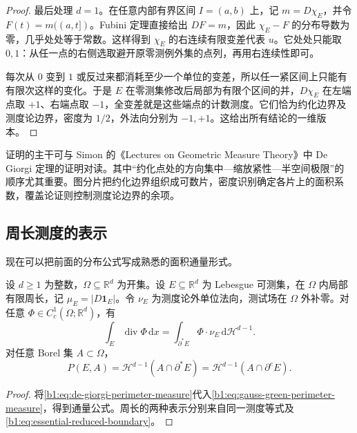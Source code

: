 \begin{proof}
最后处理 \(d=1\)。在任意内部有界区间 \(I=(a,b)\) 上，记 \(m=D\chi_E\)，并令 \(F(t)=m((a,t])\)。Fubini 定理直接给出 \(DF=m\)，因此 \(\chi_E-F\) 的分布导数为零，几乎处处等于常数。这样得到 \(\chi_E\) 的右连续有限变差代表 \(u\)。它处处只能取 \(0,1\)：从任一点的右侧选取避开原零测例外集的点列，再用右连续性即可。

每次从 \(0\) 变到 \(1\) 或反过来都消耗至少一个单位的变差，所以任一紧区间上只能有有限次这样的变化。于是 \(E\) 在零测集修改后局部为有限个区间的并，\(D\chi_E\) 在左端点取 \(+1\)、右端点取 \(-1\)，全变差就是这些端点的计数测度。它们恰为约化边界及测度论边界，密度为 \(1/2\)，外法向分别为 \(-1,+1\)。这给出所有结论的一维版本。
\end{proof}

证明的主干可与 Simon 的《Lectures on Geometric Measure Theory》中 De Giorgi 定理的证明对读\cite[\S14, 14.3 THEOREM, pp. 72--76]{Simon1983Lectures}。其中“约化点处的方向集中—缩放紧性—半空间极限”的顺序尤其重要。图分片把约化边界组织成可数片，密度识别确定各片上的面积系数，覆盖论证则控制测度论边界的余项。

\subsection{周长测度的表示}
\label{b1:subsec:270504}

现在可以把前面的分布公式写成熟悉的面积通量形式。

\begin{theorem}\label{b1:thm:gauss-green-finite-perimeter}
设 \(d\ge1\) 为整数，\(\Omega\subseteq\mathbb R^d\) 为开集。设 \(E\subseteq\mathbb R^d\) 为 Lebesgue 可测集，在 \(\Omega\) 内局部有限周长，记 \(\mu_E=|D\mathbf1_E|\)。令 \(\nu_E\) 为测度论外单位法向，测试场在 \(\Omega\) 外补零。对任意 \(\Phi\in C_c^1(\Omega;\mathbb R^d)\)，有
\begin{equation}\label{b1:eq:gauss-green-hausdorff}
 \int_E\operatorname{div}\Phi\,\mathrm dx
 =\int_{\partial^*E}\Phi\cdot\nu_E\,\mathrm d\mathcal H^{d-1}.
\end{equation}
对任意 Borel 集 \(A\subset\Omega\)，
\[
 P(E,A)=\mathcal H^{d-1}(A\cap\partial^*E)
       =\mathcal H^{d-1}(A\cap\partial^eE).
\]
\end{theorem}
\begin{proof}
将\eqref{b1:eq:de-giorgi-perimeter-measure}代入\eqref{b1:eq:gauss-green-perimeter-measure}，得到通量公式。周长的两种表示分别来自同一测度等式及\eqref{b1:eq:essential-reduced-boundary}。
\end{proof}

